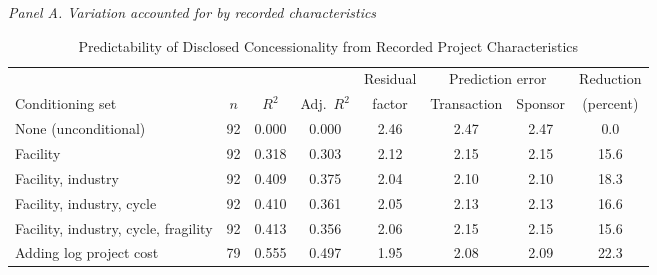 \begin{table}[htbp]
\centering
\caption{Predictability of Disclosed Concessionality from Recorded Project Characteristics}
\label{tab:concessionality-dispersion}
\small
\textit{Panel A. Variation accounted for by recorded characteristics}\\[2pt]
\begin{tabular}{lccccccc}
\toprule
 & & & & Residual & \multicolumn{2}{c}{Prediction error} & Reduction \\
\cmidrule(lr){6-7}
Conditioning set & $n$ & $R^2$ & Adj.\ $R^2$ & factor & Transaction & Sponsor & (percent) \\
\midrule
None (unconditional) & 92 & 0.000 & 0.000 & 2.46 & 2.47 & 2.47 & 0.0 \\
Facility & 92 & 0.318 & 0.303 & 2.12 & 2.15 & 2.15 & 15.6 \\
Facility, industry & 92 & 0.409 & 0.375 & 2.04 & 2.10 & 2.10 & 18.3 \\
Facility, industry, cycle & 92 & 0.410 & 0.361 & 2.05 & 2.13 & 2.13 & 16.6 \\
Facility, industry, cycle, fragility & 92 & 0.413 & 0.356 & 2.06 & 2.15 & 2.15 & 15.6 \\
Adding log project cost & 79 & 0.555 & 0.497 & 1.95 & 2.08 & 2.09 & 22.3 \\
\bottomrule
\end{tabular}


\end{table}
